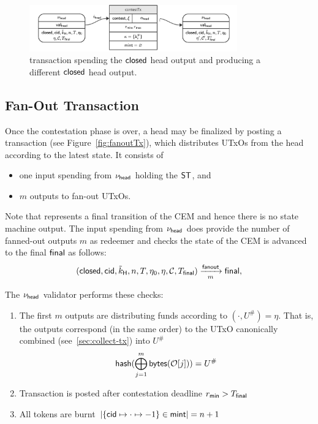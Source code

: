 \begin{figure}[h]
	\centering \includegraphics[width=0.8\textwidth]{figures/contestTx.pdf}
	\caption{\mtxContest{} transaction spending the $\mathsf{closed}$ head output and producing a different $\mathsf{closed}$ head output.}\label{fig:contestTx}
\end{figure}

\subsection{Fan-Out Transaction}

\begin{samepage}
	Once the contestation phase is over, a head may be finalized by posting a
	\mtxFanout{} transaction (see Figure~\ref{fig:fanoutTx}), which
	distributes UTxOs from the head according to the latest state. It consists of
	\begin{itemize}
		\item one input spending from $\nu_\mathsf{head}$ holding the $\mathsf{ST}$, and
		\item $m$ outputs to fan-out UTxOs.
	\end{itemize}
	Note that \mtxFanout{} represents a final transition of the CEM and hence there
	is no state machine output. The input spending from $\nu_\mathsf{head}$ does provide the
	number of fanned-out outputs $m$ as redeemer and checks the state of the CEM is
	advanced to the final $\mathsf{final}$ as follows:
	\[
		(\mathsf{closed},\mathsf{cid},\tilde{k}_{\mathsf{H}},n,T,\eta_0,\eta,\mathcal{C},T_{\mathsf{final}}) \xrightarrow[m]{\mathsf{fanout}} \mathsf{final},
	\]
\end{samepage}

\noindent The $\nu_\mathsf{head}$ validator performs these checks:
\begin{enumerate}
	\item The first $m$ outputs are distributing funds according to
	      $(\cdot, U^{\#}) = \eta$. That is, the outputs correspond (in the same
	      order) to the UTxO canonically combined (see~\ref{sec:collect-tx}) into
	      $U^{\#}$
	      \[
		      \mathsf{hash}(\bigoplus_{j=1}^{m} \mathsf{bytes}(\mathcal{O}[j])) = U^{\#}
	      \]
	\item Transaction is posted after contestation deadline $r_{\mathsf{min}} > T_{\mathsf{final}}$
	\item All tokens are burnt
	      $|\{\mathsf{cid} \mapsto \cdot \mapsto -1\} \in \mathsf{mint}| = n + 1$
\end{enumerate}

